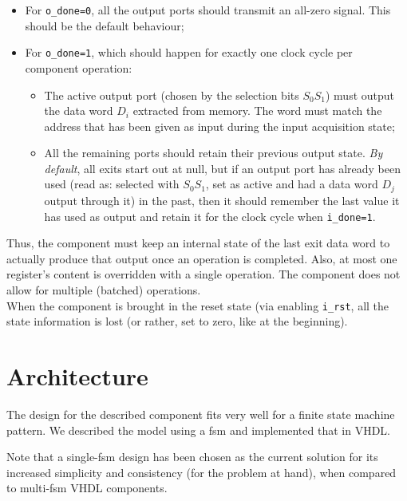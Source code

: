 \documentclass[12pt,a4paper]{article}
\newcommand{\code}{\texttt}
\begin{document}
	\begin{itemize}
		\item For \code{o\_done=0}, all the output ports should transmit an all-zero signal. This should be the default behaviour;
		\item For \code{o\_done=1}, which should happen for exactly one clock cycle per component operation:
		\begin{itemize}[label=$\star$]
			\item The active output port (chosen by the selection bits $S_0 S_1$) must output the data word $D_i$ extracted from memory. The word must match the address that has been given as input during the input acquisition state;
			\item All the remaining ports should retain their previous output state. \textit{By default}, all exits start out at null, but if an output port has already been used  (read as: selected with $S_0 S_1$, set as active and had a data word $D_j$ output through it) in the past, then it should remember the last value it has used as output and retain it for the clock cycle when \code{i\_done=1}.
		\end{itemize}
	\end{itemize}

        Thus, the component must keep an internal state of the last exit data word to actually produce that output once an operation is completed.
        Also, at most one register's content is overridden with a single operation. The component does not allow for multiple (batched) operations.\\When the component is brought in the reset state (via enabling \code{i\_rst}, all the state information is lost (or rather, set to zero, like at the beginning).



	\newpage

	\section{Architecture}

	The design for the described component fits very well for a finite state machine pattern. We described the model using a fsm and implemented that in VHDL.

        Note that a single-fsm design has been chosen as the current solution for its increased simplicity and consistency (for the problem at hand), when compared to multi-fsm VHDL components.
\end{document}
